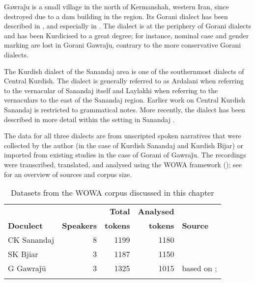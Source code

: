 \documentclass[output=paper,colorlinks,citecolor=brown]{langscibook}
\begin{document}
\begin{sloppypar}
Gawraǰu is a small village in the north of Kermanshah, western Iran, since destroyed due to a dam building in the region. Its Gorani dialect has been described in \citet{mahmoudveysi_gorani_2012}, and especially in \citet{bailey_grammar_2018}. The dialect is at the periphery of Gorani dialects and has been Kurdicised to a great degree; for instance, nominal case and gender marking are lost in Gorani Gawraǰu, contrary to the more conservative Gorani dialects.

The Kurdish dialect of the Sanandaj area is one of the southernmost dialects of Central Kurdish. The dialect is generally referred to as Ardalani when referring to the vernacular of Sanandaj itself and Laylakhi when referring to the vernaculars to the east of the Sanandaj region. Earlier work on Central Kurdish Sanandaj is restricted to  grammatical notes. More recently, the dialect has been described in more detail within the  setting in Sanandaj \citep[][]{khan_language_2023}{}{}.

The data for all three dialects are from unscripted spoken narratives that were collected by the author (in the case of Kurdish Sanandaj and Kurdish Bijar) or imported from existing studies in the case of Gorani of Gawraǰu. The recordings were transcribed, translated, and analysed using the WOWA framework (); see  for an overview of sources and corpus size.

\begin{table}
    \begin{tabularx}{\textwidth}{l@{}rrrQ}%
\lsptoprule
&& \textbf{Total} & \textbf{Analysed} &  \\
\textbf{Doculect} & \textbf{Speakers} & \textbf{tokens}& \textbf{tokens}& \textbf{Source}\\
\midrule
CK Sanandaj & 8 & 1199 & 1180 & \citealt{mohammadirad_Sanandaj_Kurdish_2022}  \\
SK Bjiar & 3 & 1187 & 1150 & \citealt{mohammadirad_Bijar_Kurdish_2022}   \\
G Gawraǰū & 3 & 1325 & 1015 & \citealt{mohammadirad_gorani_2022} based  on \citealt{mahmoudveysi_gorani_2012}; \citealt{bailey_grammar_2018}  \\
\lspbottomrule
    \end{tabularx}
    \caption{Datasets from the WOWA corpus discussed in this chapter}
    \label{Gorani:tab:1}
\end{table}


\end{sloppypar}
\end{document}

